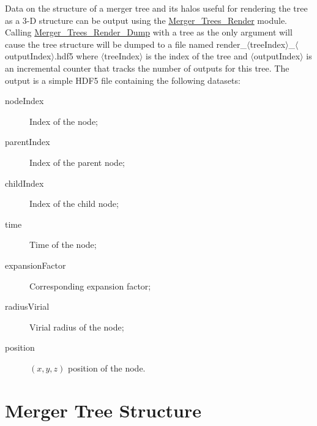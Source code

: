 Data on the structure of a merger tree and its halos useful for rendering the tree as a 3-D structure can be output using the \href{https://github.com/galacticusorg/galacticus/releases/download/masterRelease/Galacticus_Source.pdf\#source.merger_trees_render_F90:merger_trees_render}{\normalfont \ttfamily Merger\_Trees\_Render} module. Calling \href{https://github.com/galacticusorg/galacticus/releases/download/masterRelease/Galacticus_Source.pdf\#source.merger_trees_render_F90:merger_trees_render:merger_trees_render_dump}{\normalfont \ttfamily Merger\_Trees\_Render\_Dump} with a tree as the only argument will cause the tree structure will be dumped to a file named {\normalfont \ttfamily render\_$\langle$treeIndex$\rangle$\_$\langle$outputIndex$\rangle$.hdf5} where $\langle${\normalfont \ttfamily treeIndex}$\rangle$ is the index of the tree and $\langle${\normalfont \ttfamily outputIndex}$\rangle$ is an incremental counter that tracks the number of outputs for this tree. The output is a simple HDF5 file containing the following datasets:
\begin{description}
 \item [{\normalfont \ttfamily nodeIndex}] Index of the node;
 \item [{\normalfont \ttfamily parentIndex}] Index of the parent node;
 \item [{\normalfont \ttfamily childIndex}] Index of the child node;
 \item [{\normalfont \ttfamily time}] Time of the node;
 \item [{\normalfont \ttfamily expansionFactor}] Corresponding expansion factor;
 \item [{\normalfont \ttfamily radiusVirial}] Virial radius of the node;
 \item [{\normalfont \ttfamily position}] $(x,y,z)$ position of the node.
\end{description}

\section{Merger Tree Structure}

